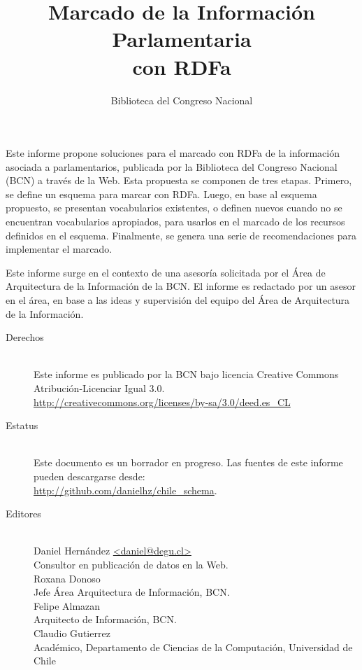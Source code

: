 \documentclass[letterpaper,titlepage]{article}
\title{Marcado de la Información Parlamentaria \\ con RDFa}
\author{Biblioteca del Congreso Nacional}
\begin{document}
\maketitle

\thispagestyle{empty}

\abstract

Este informe propone soluciones para el marcado con RDFa de la
información asociada a parlamentarios, publicada por la Biblioteca del
Congreso Nacional (BCN) a través de la Web. Esta propuesta se
componen de tres etapas. Primero, se define un esquema para marcar
con RDFa. Luego, en base al esquema propuesto, se presentan
vocabularios existentes, o definen nuevos cuando no se encuentran
vocabularios apropiados, para usarlos en el marcado de los recursos
definidos en el esquema. Finalmente, se genera una serie de
recomendaciones para implementar el marcado. \medskip

Este informe surge en el contexto de una asesoría solicitada por el
Área de Arquitectura de la Información de la BCN. El informe es
redactado por un asesor en el área, en base a las
ideas y supervisión del equipo del Área de Arquitectura de la
Información.

\newpage

\thispagestyle{empty}

\null

\vfill

\begin{description}
\item[Derechos] \hfill \\
  Este informe es publicado por la BCN
  bajo licencia Creative Commons Atribución-Licenciar Igual 3.0. \\
  \url{http://creativecommons.org/licenses/by-sa/3.0/deed.es_CL}
\item[Estatus] \hfill \\
  Este documento es un borrador en progreso.
  Las fuentes de este informe pueden descargarse desde: \\
  \url{http://github.com/danielhz/chile_schema}.
\item[Editores] \hfill \\
  {\sf Daniel Hernández} \url{<daniel@degu.cl>} \\
  {Consultor en publicación de datos en la Web.} \\
  {\sf Roxana Donoso} \\
  {Jefe Área Arquitectura de Información, BCN.} \\
  {\sf Felipe Almazan} \\
  {Arquitecto de Información, BCN.} \\
  {\sf Claudio Gutierrez} \\
  {Académico, Departamento de Ciencias de la Computación, Universidad de Chile}
\end{description}
\end{document}
